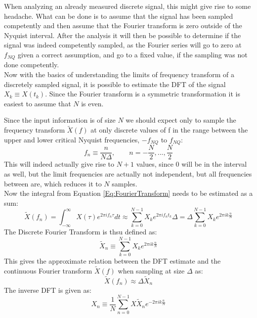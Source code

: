 \documentclass[../../CompleteThesis/Complete_1stDraft]{subfiles}
\begin{document}
When analyzing an already measured discrete signal, this might give rise to some headache. What can be done is to assume that the signal has been sampled competently and then assume that the Fourier transform is zero outside of the Nyquist interval. After the analysis it will then be possible to determine if the signal was indeed competently sampled, as the Fourier series will go to zero at $f_{NQ}$ given a correct assumption, and go to a fixed value, if the sampling was not done competently.\\
Now with the basics of understanding the limits of frequency transform of a discretely sampled signal, it is possible to estimate the DFT of the signal $X_k \equiv X(t_k)$. Since the Fourier transform is a symmetric transformation it is easiest to assume that $N$ is even.

Since the input information is of size $N$ we should expect only to sample the frequency transform $\tilde{X}(f)$ at only discrete values of f in the range between the upper and lower critical Nyquist frequencies, $-f_{NQ}$ to $f_{NQ}$:
\begin{equation}
	f_n \equiv \frac{n}{N\Delta}, \qquad n = -\frac{N}{2}, ..., \frac{N}{2}
	\label{Eq:FreqNQRange}
\end{equation}
This will indeed actually give rise to $N+1$ values, since 0 will be in the interval as well, but the limit frequencies are actually not independent, but all frequencies between are, which reduces it to $N$ samples. \\
Now the integral from Equation \ref{Eq:FourierTransform} needs to be estimated as a sum:
\begin{equation}
	\tilde{X}(f_n) = \int_{-\infty}^{\infty} X(\tau) e^{2\pi i f_n \tau} dt \approx  \sum_{k=0}^{N-1}X_k e^{2\pi i f_n t_k} \Delta = \Delta \sum_{k=0}^{N-1}X_k e^{2\pi i k \frac{n}{N}}
	\label{Eq:DFTestimation}
\end{equation}
The Discrete Fourier Transform is thsu defined as:
\begin{equation}
	\tilde{X}_n \equiv  \sum_{k=0}^{N-1}X_k e^{2\pi i k \frac{n}{N}}
	\label{Eq:DFT}
\end{equation}
This gives the approximate relation between the DFT estimate and the continuous Fourier transform $\tilde{X}(f)$ when sampling at size $\Delta$ as:
\begin{equation}
	\tilde{X}(f_n) \approx \Delta \tilde{X}_n
\end{equation}
The inverse DFT is given as:
\begin{equation}
	X_n \equiv \frac{1}{N} \sum_{n=0}^{N-1}X\tilde{X}_n e^{-2\pi i k \frac{n}{N}}
	\label{Eq:inverseDFT}
\end{equation}
\end{document}
